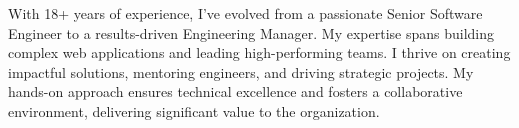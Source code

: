 
\begin{cvparagraph}
With 18+ years of experience, I've evolved from a passionate Senior Software Engineer to a results-driven Engineering Manager. My expertise spans building complex web applications and leading high-performing teams. I thrive on creating impactful solutions, mentoring engineers, and driving strategic projects. My hands-on approach ensures technical excellence and fosters a collaborative environment, delivering significant value to the organization.\\\\
\end{cvparagraph}
